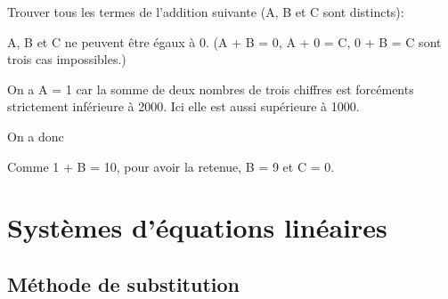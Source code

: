 \documentclass[fleqn,a4paper,nobib]{tufte-handout}
\begin{document}
\begin{exercise}
    Trouver tous les termes de l'addition suivante (A, B et C sont distincts):

\end{exercise}

\begin{solution}
    A, B et C ne peuvent être égaux à 0. (A + B = 0, A + 0 = C, 0 + B = C sont
    trois cas impossibles.)

    On a A = 1 car la somme de deux nombres de trois chiffres
    est forcéments strictement inférieure à 2000. Ici elle est
    aussi supérieure à 1000.

    On a donc



    Comme 1 + B = 10, pour avoir la retenue, B = 9 et C = 0.

\end{solution}


\section{Systèmes d'équations linéaires}

\subsection{Méthode de substitution}
\end{document}
